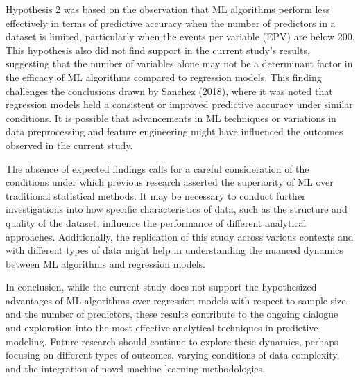 \documentclass[
  man]{apa7}
\begin{document}
Hypothesis 2 was based on the observation that ML algorithms perform less effectively in terms of predictive accuracy when the number of predictors in a dataset is limited, particularly when the events per variable (EPV) are below 200. This hypothesis also did not find support in the current study's results, suggesting that the number of variables alone may not be a determinant factor in the efficacy of ML algorithms compared to regression models. This finding challenges the conclusions drawn by Sanchez (2018), where it was noted that regression models held a consistent or improved predictive accuracy under similar conditions. It is possible that advancements in ML techniques or variations in data preprocessing and feature engineering might have influenced the outcomes observed in the current study.

The absence of expected findings calls for a careful consideration of the conditions under which previous research asserted the superiority of ML over traditional statistical methods. It may be necessary to conduct further investigations into how specific characteristics of data, such as the structure and quality of the dataset, influence the performance of different analytical approaches. Additionally, the replication of this study across various contexts and with different types of data might help in understanding the nuanced dynamics between ML algorithms and regression models.

In conclusion, while the current study does not support the hypothesized advantages of ML algorithms over regression models with respect to sample size and the number of predictors, these results contribute to the ongoing dialogue and exploration into the most effective analytical techniques in predictive modeling. Future research should continue to explore these dynamics, perhaps focusing on different types of outcomes, varying conditions of data complexity, and the integration of novel machine learning methodologies.
\end{document}

